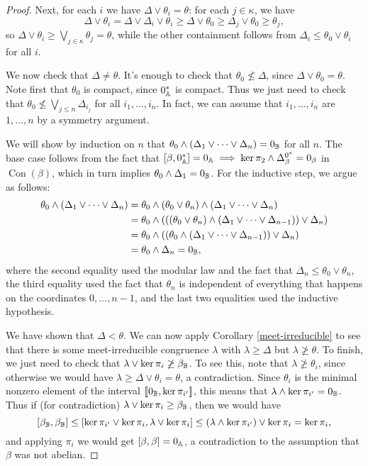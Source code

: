 \documentclass[letterpaper,11pt]{article}
\DeclareMathOperator{\Con}{Con}
\begin{document}
\begin{proof}
Next, for each $i$ we have $\Delta \vee \theta_i = \theta$: for each $j \in \kappa$, we have
\[
\Delta \vee \theta_i = \Delta \vee \Delta_i \vee \theta_i \ge \Delta \vee \theta_0 \ge \Delta_j \vee \theta_0 \ge \theta_j,
\]
so $\Delta \vee \theta_i \ge \bigvee_{j \in \kappa} \theta_j = \theta$, while the other containment follows from $\Delta_i \le \theta_0 \vee \theta_i$ for all $i$.

We now check that $\Delta \ne \theta$. It's enough to check that $\theta_0 \not\le \Delta$, since $\Delta \vee \theta_0 = \theta$. Note first that $\theta_0$ is compact, since $0^*_{\mathbb{A}}$ is compact. Thus we just need to check that $\theta_0 \not\le \bigvee_{j \le n} \Delta_{i_j}$ for all $i_1, ..., i_n$. In fact, we can assume that $i_1, ..., i_n$ are $1, ..., n$ by a symmetry argument.

We will show by induction on $n$ that $\theta_0\wedge (\Delta_1 \vee \cdots \vee \Delta_n) = 0_{\mathbb{B}}$ for all $n$. The base case follows from the fact that $[\beta,0^*_{\mathbb{A}}] = 0_{\mathbb{A}} \implies \ker \pi_2 \wedge \Delta_\beta^{0^*} = 0_\beta$ in $\Con(\beta)$, which in turn implies $\theta_0 \wedge \Delta_1 = 0_{\mathbb{B}}$. For the inductive step, we argue as follows:
\begin{align*}
\theta_0\wedge (\Delta_1 \vee \cdots \vee \Delta_n) &= \theta_0\wedge (\theta_0\vee \theta_n)\wedge (\Delta_1 \vee \cdots \vee \Delta_n)\\
&= \theta_0 \wedge (((\theta_0\vee \theta_n) \wedge (\Delta_1 \vee \cdots \vee \Delta_{n-1})) \vee \Delta_n)\\
&= \theta_0 \wedge ((\theta_0 \wedge (\Delta_1 \vee \cdots \vee \Delta_{n-1})) \vee \Delta_n)\\
&= \theta_0 \wedge \Delta_n = 0_{\mathbb{B}},
\end{align*}
where the second equality used the modular law and the fact that $\Delta_n \le \theta_0\vee \theta_n$, the third equality used the fact that $\theta_n$ is independent of everything that happens on the coordinates $0, ..., n-1$, and the last two equalities used the inductive hypothesis.

We have shown that $\Delta < \theta$. We can now apply Corollary \ref{meet-irreducible} to see that there is some meet-irreducible congruence $\lambda$ with $\lambda \ge \Delta$ but $\lambda \not\ge \theta$. To finish, we just need to check that $\lambda \vee \ker \pi_i \not\ge \beta_{\mathbb{B}}$. To see this, note that $\lambda \not\ge \theta_i$, since otherwise we would have $\lambda \ge \Delta \vee \theta_i = \theta$, a contradiction. Since $\theta_i$ is the minimal nonzero element of the interval $\llbracket 0_{\mathbb{B}}, \ker \pi_{i'}\rrbracket$, this means that $\lambda \wedge \ker \pi_{i'} = 0_{\mathbb{B}}$. Thus if (for contradiction) $\lambda \vee \ker \pi_i \ge \beta_{\mathbb{B}}$, then we would have
\[
[\beta_{\mathbb{B}}, \beta_{\mathbb{B}}] \le [\ker \pi_{i'} \vee \ker \pi_i, \lambda \vee \ker \pi_i] \le (\lambda \wedge \ker \pi_{i'}) \vee \ker \pi_i = \ker \pi_i,
\]
and applying $\pi_i$ we would get $[\beta,\beta] = 0_{\mathbb{A}}$, a contradiction to the assumption that $\beta$ was not abelian.


\end{proof}
\end{document}
